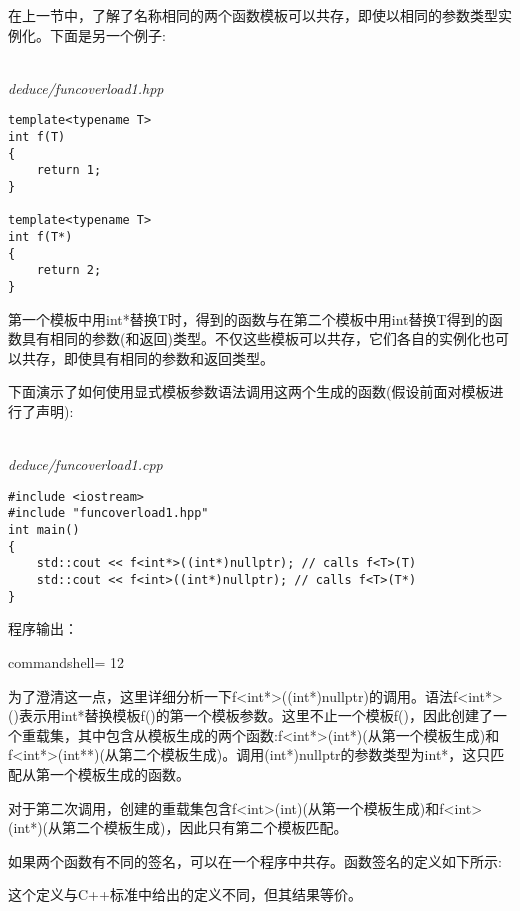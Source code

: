 

在上一节中，了解了名称相同的两个函数模板可以共存，即使以相同的参数类型实例化。下面是另一个例子:

\hspace*{\fill} \\ %
\noindent
\textit{deduce/funcoverload1.hpp}
\begin{lstlisting}[style=styleCXX]
template<typename T>
int f(T)
{
	return 1;
}

template<typename T>
int f(T*)
{
	return 2;
}
\end{lstlisting}

第一个模板中用int*替换T时，得到的函数与在第二个模板中用int替换T得到的函数具有相同的参数(和返回)类型。不仅这些模板可以共存，它们各自的实例化也可以共存，即使具有相同的参数和返回类型。

下面演示了如何使用显式模板参数语法调用这两个生成的函数(假设前面对模板进行了声明):

\hspace*{\fill} \\ %
\noindent
\textit{deduce/funcoverload1.cpp}
\begin{lstlisting}[style=styleCXX]
#include <iostream>
#include "funcoverload1.hpp"
int main()
{
	std::cout << f<int*>((int*)nullptr); // calls f<T>(T)
	std::cout << f<int>((int*)nullptr); // calls f<T>(T*)
}
\end{lstlisting}

程序输出：

\begin{tcblisting}{commandshell={}}
12
\end{tcblisting}

为了澄清这一点，这里详细分析一下f<int*>((int*)nullptr)的调用。语法f<int*>()表示用int*替换模板f()的第一个模板参数。这里不止一个模板f()，因此创建了一个重载集，其中包含从模板生成的两个函数:f<int*>(int*)(从第一个模板生成)和f<int*>(int**)(从第二个模板生成)。调用(int*)nullptr的参数类型为int*，这只匹配从第一个模板生成的函数。

对于第二次调用，创建的重载集包含f<int>(int)(从第一个模板生成)和f<int>(int*)(从第二个模板生成)，因此只有第二个模板匹配。


如果两个函数有不同的签名，可以在一个程序中共存。函数签名的定义如下所示:

\begin{tcolorbox}[colback=webgreen!5!white,colframe=webgreen!75!black]
\hspace*{0.75cm}这个定义与C++标准中给出的定义不同，但其结果等价。
\end{tcolorbox}

